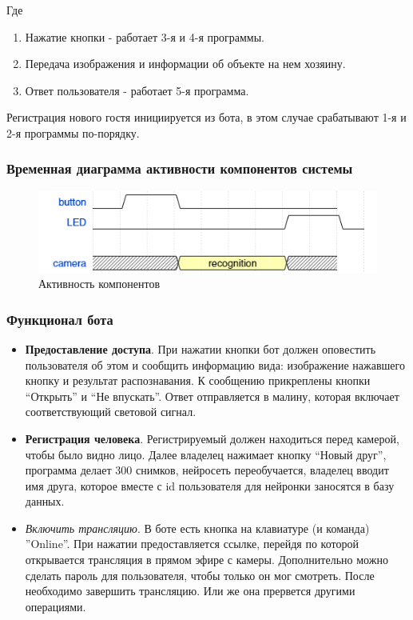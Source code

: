 \documentclass[a4paper,11pt]{article}
\begin{document}
\newpage
\noindent Где
\begin{enumerate}
  \item Нажатие кнопки - работает 3-я и 4-я программы.
  \item Передача изображения и информации об объекте на нем хозяину.
  \item Ответ пользователя - работает 5-я программа.
\end{enumerate}
\noindent Регистрация нового гостя инициируется из бота, в этом случае срабатывают 1-я и 2-я программы по-порядку. \\
\subsubsection{Временная диаграмма активности компонентов системы}
\begin{figure}[h!]
  \begin{center}
    \includegraphics[scale=0.8]{images/рис_17.png}
  \caption{Активность компонентов}
  \end{center}
\end{figure}

\subsubsection{Функционал бота}
\begin{itemize}
  \item \textbf{Предоставление доступа}. При нажатии кнопки бот должен оповестить пользователя об этом и сообщить информацию вида: изображение нажавшего кнопку и результат распознавания. К сообщению прикреплены кнопки “Открыть” и “Не впускать”. Ответ отправляется в малину, которая включает соответствующий световой сигнал.
  \item \textbf{Регистрация человека}. Регистрируемый должен находиться перед камерой, чтобы было видно лицо. Далее владелец нажимает кнопку “Новый друг”, программа делает 300 снимков, нейросеть переобучается, владелец вводит имя друга, которое вместе с id пользователя для нейронки заносятся в базу данных.
  \item \textit{Включить трансляцию}. В боте есть кнопка на клавиатуре (и команда) ”Online”. При нажатии предоставляется ссылке, перейдя по которой открывается трансляция в прямом эфире с камеры. Дополнительно можно сделать пароль для пользователя, чтобы только он мог смотреть. После необходимо завершить трансляцию. Или же она прервется другими операциями.
\end{itemize}
\end{document}

